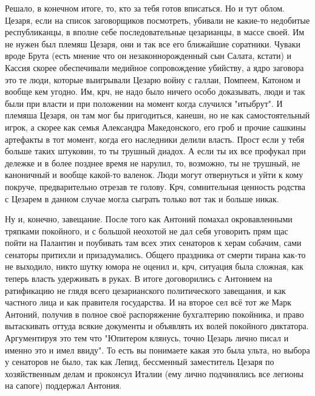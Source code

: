 Решало, в конечном итоге, то, кто за тебя готов вписаться. Но и тут облом. Цезаря, если на список заговорщиков посмотреть, убивали не какие-то недобитые республиканцы, в вполне себе последовательные цезарианцы, в массе своей. Им не нужен был племяш Цезаря, они и так все его ближайшие соратники. Чуваки вроде Брута (есть мнение что он незаконнорожденный сын Салата, кстати) и Кассия скорее обеспечивали медийное сопровождение убийству, а ядро заговора это те люди, которые выигрывали Цезарю войну с галлаи, Помпеем, Катоном и вообще кем угодно. Им, крч, не надо было ничего особо доказывать, люди и так были при власти и при положении на момент когда случился "итыбрут". И племяша Цезаря, он там мог бы пригодиться, канешн, но не как самостоятельный игрок, а скорее как семья Александра Македонского, его гроб и прочие сашкины артефакты в тот момент, когда его наследники делили власть. Прост если у тебя больше таких штуковин, то ты трушный диадох. А если ты их все профукал при дележке и в более позднее время не нарулил, то, возможно, ты не трушный, не каноничный и вообще какой-то валенок. Люди могут отвернуться и уйти к кому покруче, предварительно отрезав те голову. Крч, сомнительная ценность родства с Цезарем в данном случае могла сыграть только вот так и больше никак.


Ну и, конечно, завещание. После того как Антоний помахал окровавленными тряпками покойного, и с большой неохотой не дал себя уговорить прям щас пойти на Палантин и поубивать там всех этих сенаторов к херам собачим, сами сенаторы притихли и призадумались. Общего праздника от смерти тирана как-то не выходило, никто шутку юмора не оценил и, крч, ситуация была сложная, как теперь власть удерживать в руках. В итоге договорились с Антонием на ратификацию не глядя всего цезарианского политического завещания, и как частного лица и как правителя государства. И на второе сел всё тот же Марк Антоний, получив в полное своё распоряжение бухгалтерию покойника, и право вытаскивать оттуда всякие документы и объявлять их волей покойного диктатора. Аргументируя это тем что "Юпитером клянусь, точно Цезарь лично писал и именно это и имел ввиду". То есть вы понимаете какая это была ульта, но выбора у сенаторов не было, так как Лепид, бессменный заместитель Цезаря по хозяйственным делам и проконсул Италии (ему лично подчинялись все легионы на сапоге) поддержал Антония.

